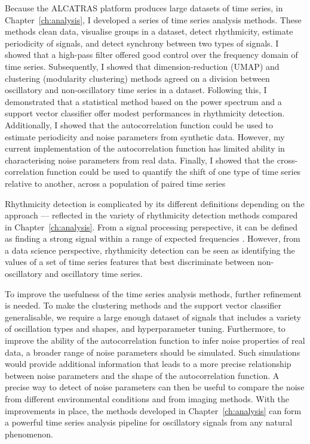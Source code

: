 Because the ALCATRAS platform produces large datasets of time series, in Chapter~\ref{ch:analysis}, I developed a series of time series analysis methods.
These methods clean data, visualise groups in a dataset, detect rhythmicity, estimate periodicity of signals, and detect synchrony between two types of signals.
I showed that a high-pass filter offered good control over the frequency domain of time series.
Subsequently, I showed that dimension-reduction (UMAP) and clustering (modularity clustering) methods agreed on a division between oscillatory and non-oscillatory time series in a dataset.
Following this, I demonstrated that a statistical method based on the power spectrum and a support vector classifier offer modest performances in rhythmicity detection.
Additionally, I showed that the autocorrelation function could be used to estimate periodicity and noise parameters from synthetic data.
However, my current implementation of the autocorrelation function has limited ability in characterising noise parameters from real data.
Finally, I showed that the cross-correlation function could be used to quantify the shift of one type of time series relative to another, across a population of paired time series

Rhythmicity detection is complicated by its different definitions depending on the approach --- reflected in the variety of rhythmicity detection methods compared in Chapter~\ref{ch:analysis}.
From a signal processing perspective, it can be defined as finding a strong signal within a range of expected frequencies \parencite{zielinskiStrengthsLimitationsPeriod2014}.
However, from a data science perspective, rhythmicity detection can be seen as identifying the values of a set of time series features that best discriminate between non-oscillatory and oscillatory time series.

To improve the usefulness of the time series analysis methods, further refinement is needed.
To make the clustering methods and the support vector classifier generalisable, we require a large enough dataset of signals that includes a variety of oscillation types and shapes, and hyperparameter tuning.
Furthermore, to improve the ability of the autocorrelation function to infer noise properties of real data, a broader range of noise parameters should be simulated.
Such simulations would provide additional information that leads to a more precise relationship between noise parameters and the shape of the autocorrelation function.
A precise way to detect of noise parameters can then be useful to compare the noise from different environmental conditions and from imaging methods.
With the improvements in place, the methods developed in Chapter~\ref{ch:analysis} can form a powerful time series analysis pipeline for oscillatory signals from any natural phenomenon.



